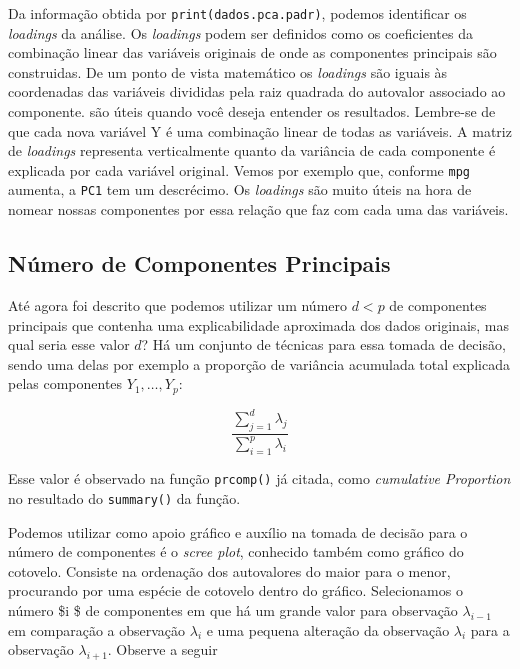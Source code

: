 \documentclass[
  letterpaper,
  DIV=11,
  numbers=noendperiod]{scrreprt}
\newenvironment{Shaded}{\begin{snugshade}}{\end{snugshade}}
\newcommand{\CommentTok}[1]{\textcolor[rgb]{0.37,0.37,0.37}{#1}}
\newcommand{\DecValTok}[1]{\textcolor[rgb]{0.68,0.00,0.00}{#1}}
\newcommand{\FunctionTok}[1]{\textcolor[rgb]{0.28,0.35,0.67}{#1}}
\newcommand{\NormalTok}[1]{\textcolor[rgb]{0.00,0.23,0.31}{#1}}
\newcommand{\OtherTok}[1]{\textcolor[rgb]{0.00,0.23,0.31}{#1}}
\newcommand{\SpecialCharTok}[1]{\textcolor[rgb]{0.37,0.37,0.37}{#1}}
\begin{document}
Da informação obtida por \texttt{print(dados.pca.padr)}, podemos
identificar os \emph{loadings} da análise. Os \emph{loadings} podem ser
definidos como os coeficientes da combinação linear das variáveis
originais de onde as componentes principais são construidas. De um ponto
de vista matemático os \emph{loadings} são iguais às coordenadas das
variáveis divididas pela raiz quadrada do autovalor associado ao
componente. são úteis quando você deseja entender os resultados.
Lembre-se de que cada nova variável Y é uma combinação linear de todas
as variáveis. A matriz de \emph{loadings} representa verticalmente
quanto da variância de cada componente é explicada por cada variável
original. Vemos por exemplo que, conforme \texttt{mpg} aumenta, a
\texttt{PC1} tem um descrécimo. Os \emph{loadings} são muito úteis na
hora de nomear nossas componentes por essa relação que faz com cada uma
das variáveis.

\hypertarget{nuxfamero-de-componentes-principais}{%
\subsection{Número de Componentes
Principais}\label{nuxfamero-de-componentes-principais}}

Até agora foi descrito que podemos utilizar um número \(d < p\) de
componentes principais que contenha uma explicabilidade aproximada dos
dados originais, mas qual seria esse valor \(d\)? Há um conjunto de
técnicas para essa tomada de decisão, sendo uma delas por exemplo a
proporção de variância acumulada total explicada pelas componentes
\(Y_1,\dots,Y_p\):

\[
\frac{\sum^d_{j=1}\lambda_j}{\sum_{i=1}^p \lambda_i}
\]

Esse valor é observado na função \texttt{prcomp()} já citada, como
\emph{cumulative Proportion} no resultado do \texttt{summary()} da
função.

Podemos utilizar como apoio gráfico e auxílio na tomada de decisão para
o número de componentes é o \emph{scree plot}, conhecido também como
gráfico do cotovelo. Consiste na ordenação dos autovalores do maior para
o menor, procurando por uma espécie de cotovelo dentro do gráfico.
Selecionamos o número \$i \$ de componentes em que há um grande valor
para observação \(\lambda_{i-1}\) em comparação a observação
\(\lambda_i\) e uma pequena alteração da observação \(\lambda_i\) para a
observação \(\lambda_{i+1}\). Observe a seguir

\begin{Shaded}
\end{Shaded}
\end{document}
